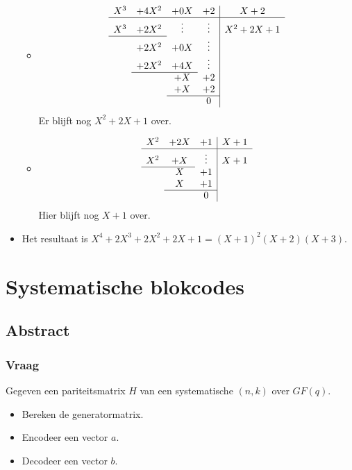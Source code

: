 \documentclass[main.tex]{subfiles}
\begin{document}
\begin{itemize}
\begin{itemize}
  \item 
    \[
    \begin{array}{cccc|c}
      X^{3} &+4X^{2} &+0X    &+2       & X+2\\\hline
      X^{3} &+2X^{2} &\vdots &\vdots   & X^{2}+2X+1\\\cline{1-2}
           &+2X^{2} &+0X    &\vdots   &\\
           &+2X^{2} &+4X    &\vdots   &\\\cline{2-3}
           &       &+X     &+2       &\\
           &       &+X     &+2       &\\\cline{3-4}
           &       &       &0        &\\
    \end{array}
    \]
    Er blijft nog $X^{2}+2X+1$ over.
  \item 
    \[
    \begin{array}{ccc|c}
      X^{2} &+2X &+1     & X+1\\\hline
      X^{2} &+X  &\vdots & X+1\\\cline{1-2}
           & X  &+1     &\\
           & X  &+1     &\\\cline{2-3}
           &    &0      &\\
    \end{array}
    \]
    Hier blijft nog $X+1$ over.
  \end{itemize}
\item Het resultaat is $X^{4} + 2X^{3} + 2X^{2} + 2X + 1 = (X+1)^{2}(X+2)(X+3)$.
\end{itemize}

\newpage

\section{Systematische blokcodes}
\subsection*{Abstract}
\subsubsection*{Vraag}
Gegeven een pariteitsmatrix $H$ van een systematische $(n,k)$ over $GF(q)$.
\begin{itemize}
\item Bereken de generatormatrix.
\item Encodeer een vector $a$.
\item Decodeer een vector $b$.
\end{itemize}
\end{document}
